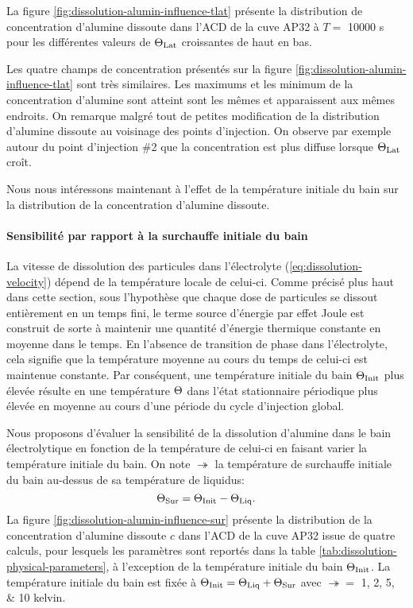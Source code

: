 

La figure \ref{fig:dissolution-alumin-influence-tlat} présente la
distribution de concentration d'alumine dissoute dans l'ACD de la cuve
AP32 à $T = $ \num{10000} \si{\second} pour les différentes valeurs
de $\Theta_\text{Lat}$ croissantes de haut en bas.

Les quatre champs de concentration présentés sur la figure
\ref{fig:dissolution-alumin-influence-tlat} sont très similaires. Les
maximums et les minimum de la concentration d'alumine sont atteint
sont les mêmes et apparaissent aux mêmes endroits. On remarque
malgré tout de petites modification de la distribution d'alumine
dissoute au voisinage des points d'injection. On observe par exemple
autour du point d'injection \#2 que la concentration est plus diffuse
lorsque $\Theta_\text{Lat}$ croît.

Nous nous intéressons maintenant à l'effet de la température
initiale du bain sur la distribution de la concentration d'alumine dissoute.

\paragraph{Sensibilité par rapport à la surchauffe initiale du bain}
La vitesse de dissolution des particules dans l'électrolyte
(\ref{eq:dissolution-velocity}) dépend de la température locale de
celui-ci. Comme précisé plus haut dans cette section, sous
l'hypothèse que chaque dose de particules se dissout entièrement
en un temps fini, le terme source d'énergie par effet Joule est
construit de sorte à maintenir une quantité d'énergie thermique
constante en moyenne dans le temps. En l'absence de transition de
phase dans l'électrolyte, cela signifie que la température moyenne au
cours du temps de celui-ci est maintenue constante. Par conséquent,
une température initiale du bain $\Theta_\text{Init}$ plus élevée résulte en une
température $\Theta$ dans l'état stationnaire périodique plus
élevée en moyenne au cours d'une période du cycle d'injection global.



Nous proposons d'évaluer la sensibilité de la dissolution d'alumine
dans le bain électrolytique en fonction de la température de celui-ci
en faisant varier la température initiale du bain. On note $\tsur$ la
température de surchauffe initiale du bain au-dessus de sa température de
liquidus:
\begin{equation}
  \Theta_\text{Sur} = \Theta_\text{Init} - \Theta_\text{Liq}.
\end{equation}
La figure \ref{fig:dissolution-alumin-influence-sur} présente la distribution
de la concentration d'alumine dissoute $c$ dans l'ACD de la cuve AP32
issue de quatre calculs, pour lesquels les paramètres sont reportés
dans la table \ref{tab:dissolution-physical-parameters}, à
l'exception de la température initiale du bain $\Theta_\text{Init}$. La
température initiale du bain est fixée à $\Theta_\text{Init} = \Theta_\text{Liq} + \Theta_\text{Sur}$ avec $\tsur = $ \numlist{1;2;5;10} kelvin.

